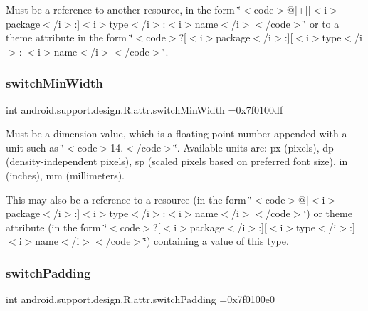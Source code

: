 Must be a reference to another resource, in the form \char`\"{}$<$code$>$@\mbox{[}+\mbox{]}\mbox{[}$<$i$>$package$<$/i$>$\+:\mbox{]}$<$i$>$type$<$/i$>$\+:$<$i$>$name$<$/i$>$$<$/code$>$\char`\"{} or to a theme attribute in the form \char`\"{}$<$code$>$?\mbox{[}$<$i$>$package$<$/i$>$\+:\mbox{]}\mbox{[}$<$i$>$type$<$/i$>$\+:\mbox{]}$<$i$>$name$<$/i$>$$<$/code$>$\char`\"{}. \mbox{\label{classandroid_1_1support_1_1design_1_1R_1_1attr_a91b9eeca090178e16f54c7a9103bb7b9}} 
\subsubsection{\texorpdfstring{switch\+Min\+Width}{switchMinWidth}}
{\footnotesize\ttfamily int android.\+support.\+design.\+R.\+attr.\+switch\+Min\+Width =0x7f0100df\hspace{0.3cm}{\ttfamily [static]}}

Must be a dimension value, which is a floating point number appended with a unit such as \char`\"{}$<$code$>$14.\+5sp$<$/code$>$\char`\"{}. Available units are\+: px (pixels), dp (density-\/independent pixels), sp (scaled pixels based on preferred font size), in (inches), mm (millimeters). 

This may also be a reference to a resource (in the form \char`\"{}$<$code$>$@\mbox{[}$<$i$>$package$<$/i$>$\+:\mbox{]}$<$i$>$type$<$/i$>$\+:$<$i$>$name$<$/i$>$$<$/code$>$\char`\"{}) or theme attribute (in the form \char`\"{}$<$code$>$?\mbox{[}$<$i$>$package$<$/i$>$\+:\mbox{]}\mbox{[}$<$i$>$type$<$/i$>$\+:\mbox{]}$<$i$>$name$<$/i$>$$<$/code$>$\char`\"{}) containing a value of this type. \mbox{\label{classandroid_1_1support_1_1design_1_1R_1_1attr_af3e0cfcf4fb4ee5950b8df4042cf6d06}} 
\subsubsection{\texorpdfstring{switch\+Padding}{switchPadding}}
{\footnotesize\ttfamily int android.\+support.\+design.\+R.\+attr.\+switch\+Padding =0x7f0100e0\hspace{0.3cm}{\ttfamily [static]}}

